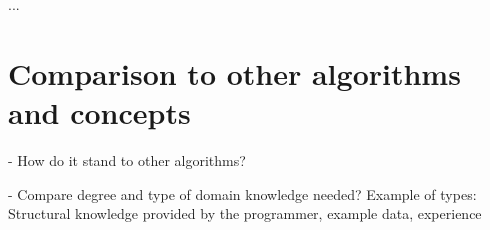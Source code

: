 ...

\section{Comparison to other algorithms and concepts}
- How do it stand to other algorithms?

- Compare degree and type of domain knowledge needed? Example of types: Structural knowledge provided by the programmer, example data, experience








